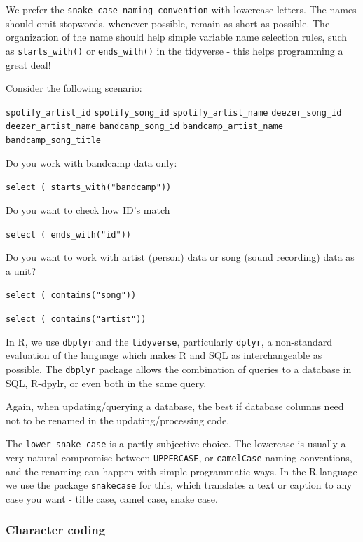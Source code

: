 \documentclass[
  fontsize=13pt,
  english,
  a4paper,
  openany, a4paper, oneside]{article}
\begin{document}
We prefer the \texttt{snake\_case\_naming\_convention} with lowercase letters. The names should omit stopwords, whenever possible, remain as short as possible. The organization of the name should help simple variable name selection rules, such as \texttt{starts\_with()} or \texttt{ends\_with()} in the tidyverse - this helps programming a great deal!

Consider the following scenario:

\texttt{spotify\_artist\_id}
\texttt{spotify\_song\_id}
\texttt{spotify\_artist\_name}
\texttt{deezer\_song\_id}
\texttt{deezer\_artist\_name}
\texttt{bandcamp\_song\_id}
\texttt{bandcamp\_artist\_name}
\texttt{bandcamp\_song\_title}

Do you work with bandcamp data only:

\texttt{select\ (\ starts\_with("bandcamp"))}

Do you want to check how ID's match

\texttt{select\ (\ ends\_with("id"))}

Do you want to work with artist (person) data or song (sound recording) data as a unit?

\texttt{select\ (\ contains("song"))}

\texttt{select\ (\ contains("artist"))}

In R, we use \texttt{dbplyr} and the \texttt{tidyverse}, particularly \texttt{dplyr}, a non-standard evaluation of the language which makes R and SQL as interchangeable as possible. The \texttt{dbplyr} package allows the combination of queries to a database in SQL, R-dpylr, or even both in the same query.

Again, when updating/querying a database, the best if database columns need not to be renamed in the updating/processing code.

The \texttt{lower\_snake\_case} is a partly subjective choice. The lowercase is usually a very natural compromise between \texttt{UPPERCASE}, or \texttt{camelCase} naming conventions, and the renaming can happen with simple programmatic ways. In the R language we use the package \texttt{snakecase} for this, which translates a text or caption to any case you want - title case, camel case, snake case.

\hypertarget{character-coding}{%
\subsubsection{Character coding}\label{character-coding}}
\end{document}
